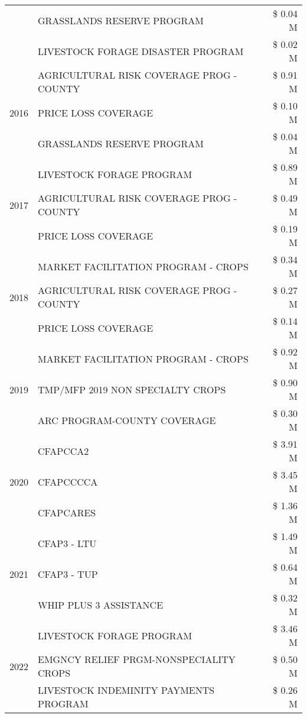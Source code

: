 \begin{tabular}{llr}
 & GRASSLANDS RESERVE PROGRAM & \$ 0.04 M \\
 & LIVESTOCK FORAGE DISASTER PROGRAM & \$ 0.02 M \\
\cline{1-3}
\multirow[t]{3}{*}{2016} & AGRICULTURAL RISK COVERAGE PROG - COUNTY & \$ 0.91 M \\
 & PRICE LOSS COVERAGE & \$ 0.10 M \\
 & GRASSLANDS RESERVE PROGRAM & \$ 0.04 M \\
\cline{1-3}
\multirow[t]{3}{*}{2017} & LIVESTOCK FORAGE PROGRAM & \$ 0.89 M \\
 & AGRICULTURAL RISK COVERAGE PROG - COUNTY & \$ 0.49 M \\
 & PRICE LOSS COVERAGE & \$ 0.19 M \\
\cline{1-3}
\multirow[t]{3}{*}{2018} & MARKET FACILITATION PROGRAM - CROPS & \$ 0.34 M \\
 & AGRICULTURAL RISK COVERAGE PROG - COUNTY & \$ 0.27 M \\
 & PRICE LOSS COVERAGE & \$ 0.14 M \\
\cline{1-3}
\multirow[t]{3}{*}{2019} & MARKET FACILITATION PROGRAM - CROPS & \$ 0.92 M \\
 & TMP/MFP 2019 NON SPECIALTY CROPS & \$ 0.90 M \\
 & ARC PROGRAM-COUNTY COVERAGE & \$ 0.30 M \\
\cline{1-3}
\multirow[t]{3}{*}{2020} & CFAPCCA2 & \$ 3.91 M \\
 & CFAPCCCCA & \$ 3.45 M \\
 & CFAPCARES & \$ 1.36 M \\
\cline{1-3}
\multirow[t]{3}{*}{2021} & CFAP3 - LTU & \$ 1.49 M \\
 & CFAP3 - TUP & \$ 0.64 M \\
 & WHIP PLUS 3 ASSISTANCE & \$ 0.32 M \\
\cline{1-3}
\multirow[t]{3}{*}{2022} & LIVESTOCK FORAGE PROGRAM & \$ 3.46 M \\
 & EMGNCY RELIEF PRGM-NONSPECIALITY CROPS & \$ 0.50 M \\
 & LIVESTOCK INDEMINITY PAYMENTS PROGRAM & \$ 0.26 M \\
\cline{1-3}
\bottomrule
\end{tabular}
